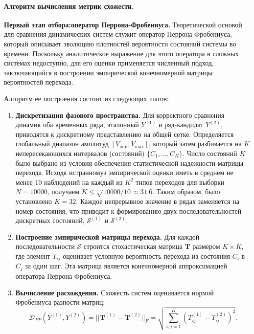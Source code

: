 \documentclass[a4paper,12pt]{extarticle}
\begin{document}
\paragraph{Алгоритм вычисления метрик схожести.}

\textbf{Первый этап отбора:оператор Перрона-Фробениуса.}
Теоретической основой для сравнения динамических систем служит оператор Перрона-Фробениуса,
 который описывает эволюцию плотностей вероятности состояний системы во времени. 
 Поскольку аналитическое выражение для этого оператора в сложных системах недоступно, 
 для его оценки применяется численный подход, заключающийся в построении эмпирической 
 конечномерной матрицы вероятностей перехода.

Алгоритм ее построения состоит из следующих шагов:

\begin{enumerate}
    \item \textbf{Дискретизация фазового пространства.} Для корректного сравнения 
    динамик оба временных ряда, эталонный $Y^{(1)}$ и ряд-кандидат $Y^{(2)}$, приводятся
     к дискретному представлению на общей сетке. Определяется глобальный диапазон амплитуд 
     $[V_{\min}, V_{\max}]$, который затем разбивается на $K$ непересекающихся интервалов 
     (состояний) $\{C_1, \dots, C_K\}$.
     Число состояний $K$ было выбрано из условия обеспечения статистической надежности
       матрицы перехода. Исходя истранномуз эмпирической оценки иметь в среднем не менее 10 наблюдений
        на каждый из $K^2$ типов переходов для выборки $N=10000$, получаем
         $K \le \sqrt{10000/10} \approx 31.6$. Таким образом, было установлено $K=32$.
 Каждое
      непрерывное значение в рядах заменяется на номер состояния, что приводит к 
      формированию двух последовательностей дискретных состояний, 
      $\mathcal{S}^{(1)}$ и $\mathcal{S}^{(2)}$.

    \item \textbf{Построение эмпирической матрицы перехода.} Для каждой 
    последовательности $\mathcal{S}$ строится стохастическая матрица $\mathbf{T}$ 
    размером $K \times K$, где элемент $T_{ij}$ оценивает условную вероятность перехода
    из состояния $C_i$ в $C_j$ за один шаг. Эта матрица является конечномерной аппроксимацией
     оператора Перрона-Фробениуса.

    \item \textbf{Вычисление расхождения.} Схожесть систем оценивается нормой Фробениуса разности матриц:
    \[
    \mathcal{D}_{PF}(Y^{(1)}, Y^{(2)}) = ||\mathbf{T}^{(1)} - \mathbf{T}^{(2)}||_F =
     \sqrt{\sum_{i,j=1}^{K} (T_{ij}^{(1)} - T_{ij}^{(2)})^2}.
    \]
\end{enumerate}
\end{document}
